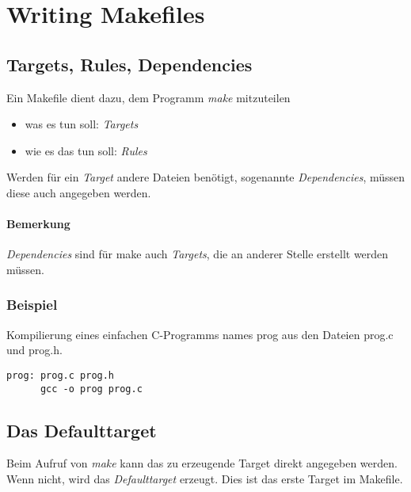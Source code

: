 \documentclass{scrartcl}
\begin{document}
\section{Writing Makefiles}
\label{sec:writing-makefiles}

\subsection{Targets, Rules, Dependencies}
\label{sec:targ-rules-depend}

Ein Makefile dient dazu, dem Programm \emph{make} mitzuteilen
\begin{itemize}
\item was es tun soll: \emph{Targets}
\item wie es das tun soll: \emph{Rules}
\end{itemize}
Werden für ein \emph{Target} andere Dateien benötigt, sogenannte
\emph{Dependencies}, müssen diese auch angegeben werden. \\

\paragraph{Bemerkung}
\label{sec:bemerkung}

\emph{Dependencies} sind für make auch \emph{Targets}, die an anderer
Stelle erstellt werden müssen.

\subsubsection{Beispiel}
\label{sec:beispiel}

Kompilierung eines einfachen C-Programms names prog aus den Dateien
prog.c und prog.h.

\begin{lstlisting}[frame=single]
  prog: prog.c prog.h
      gcc -o prog prog.c
\end{lstlisting}

\subsection{Das Defaulttarget}
\label{sec:das-defaulttarget}

Beim Aufruf von \emph{make} kann das zu erzeugende Target direkt
angegeben werden. Wenn nicht, wird das \emph{Defaulttarget}
erzeugt. Dies ist das erste Target im Makefile.
\end{document}

